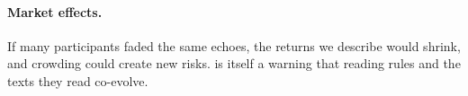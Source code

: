 \documentclass{article}
\theoremstyle{plain}
\theoremstyle{definition}
\theoremstyle{remark}
\begin{document}
\paragraph{Market effects.} If many participants faded the same echoes, the returns we describe would shrink, and crowding could create new risks.  is itself a warning that reading rules and the texts they read co-evolve.
\end{document}
